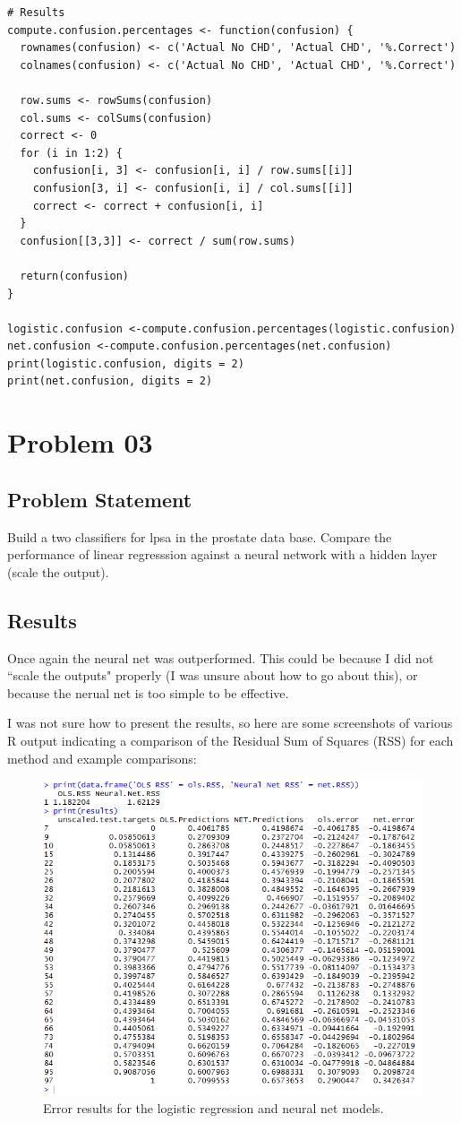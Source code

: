 \documentclass{article}
\begin{document}
\begin{verbatim}
# Results
compute.confusion.percentages <- function(confusion) {
  rownames(confusion) <- c('Actual No CHD', 'Actual CHD', '%.Correct')
  colnames(confusion) <- c('Actual No CHD', 'Actual CHD', '%.Correct')

  row.sums <- rowSums(confusion)
  col.sums <- colSums(confusion)
  correct <- 0
  for (i in 1:2) {
    confusion[i, 3] <- confusion[i, i] / row.sums[[i]]
    confusion[3, i] <- confusion[i, i] / col.sums[[i]]
    correct <- correct + confusion[i, i]
  }
  confusion[[3,3]] <- correct / sum(row.sums)

  return(confusion)
}

logistic.confusion <-compute.confusion.percentages(logistic.confusion)
net.confusion <-compute.confusion.percentages(net.confusion)
print(logistic.confusion, digits = 2)
print(net.confusion, digits = 2)
\end{verbatim}


\newpage
\section{Problem 03}
\subsection{Problem Statement}
Build a two classifiers for lpsa in the prostate data base. Compare the performance of linear regresssion against a neural network with a hidden layer (scale the output).

\subsection{Results}
Once again the neural net was outperformed. This could be because I did not ``scale the outputs" properly (I was unsure about how to go about this), or because the nerual net is too simple to be effective.

I was not sure how to present the results, so here are some screenshots of various R output indicating a comparison of the Residual Sum of Squares (RSS) for each method and example comparisons:

\begin{figure}[h!]
  \centering
  \includegraphics[width=.8\linewidth]{Problem_04_results}
  \caption{Error results for the logistic regression and neural net models.}
  \label{fig:P04_results}
\end{figure}
\end{document}
